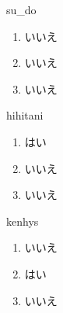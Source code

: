 \begin{prework}{ su\_do }
  \begin{enumerate}
  \item いいえ
  \item いいえ
  \item いいえ
  \end{enumerate}
\end{prework}

\begin{prework}{ hihitani }
  \begin{enumerate}
  \item はい
  \item いいえ
  \item いいえ
  \end{enumerate}
\end{prework}

\begin{prework}{ kenhys }
  \begin{enumerate}
  \item いいえ
  \item はい
  \item いいえ
  \end{enumerate}
\end{prework}
